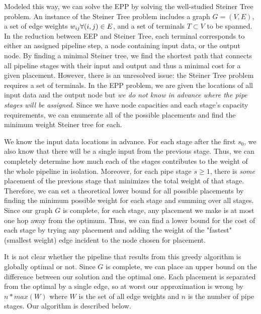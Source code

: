 \documentclass{article}
\newcommand{\foralle}[2]{\ensuremath{\forall (#1,#2) \in E }}
\begin{document}
	Modeled this way, we can solve the EPP by solving the well-studied Steiner Tree problem. An instance of the Steiner Tree problem includes a graph $G = (V,E)$, a set of edge weights $w_{ij} \space \foralle{i}{j}$, and a set of terminals $T \subset V$ to be spanned. In the reduction between EEP and Steiner Tree, each terminal corresponds to either an assigned pipeline step, a node containing input data, or the output node. By finding a minimal Steiner tree, we find the shortest path that connects all pipeline stages with their input and output and thus a minimal cost for a given placement. However, there is an unresolved issue: the Steiner Tree problem requires a set of terminals. In the EPP problem, we are given the locations of all input data and the output node but \textit{we do not know in advance where the pipe stages will be assigned}. Since we have node capacities and each stage's capacity requirements, we can enumerate all of the possible placements and find the minimum weight Steiner tree for each. 
	
	We know the input data locations in advance. For each stage after the first $s_{0}$, we also know that there will be a single input from the previous stage. Thus, we can completely determine how much each of the stages contributes to the weight of the whole pipeline in isolation. Moreover, for each pipe stage $s \ge 1$, there is \textit{some} placement of the previous stage that minimizes the total weight of that stage. Therefore, we can set a theoretical lower bound for all possible placements by finding the minimum possible weight for each stage and summing over all stages. Since our graph $G$ is complete, for each stage, any placement we make is at most one hop away from the optimum. Thus, we can find a lower bound for the cost of each stage by trying any placement and adding the weight of the "fastest" (smallest weight) edge incident to the node chosen for placement.
	
	It is not clear whether the pipeline that results from this greedy algorithm is globally optimal or not. Since $G$ is complete, we can place an upper bound on the difference between our solution and the optimal one. Each placement is separated from the optimal by a single edge, so at worst our approximation is wrong by $n * max(W)$ where $W$ is the set of all edge weights and $n$ is the number of pipe stages. Our algorithm is described below.
	
\end{document}
